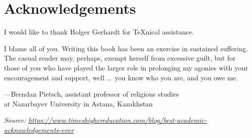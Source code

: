 \chapter{Acknowledgements}

I would like to thank Holger Gerhardt for TeXnical assistance.

I blame all of you. Writing this book has been an exercise in sustained suffering. The casual reader may, perhaps, exempt herself from excessive guilt, but for those of you who have played the larger role in prolonging my agonies with your encouragement and support, well \dots\ you know who you are, and you owe me.

\RaggedLeft
---Brendan Pietsch, assistant professor of religious studies \\
at Nazarbayev University in Astana, Kazakhstan

\bigskip

\textit{Source: \url{https://www.timeshighereducation.com/blog/best-academic-acknowledgements-ever}}

\justifying